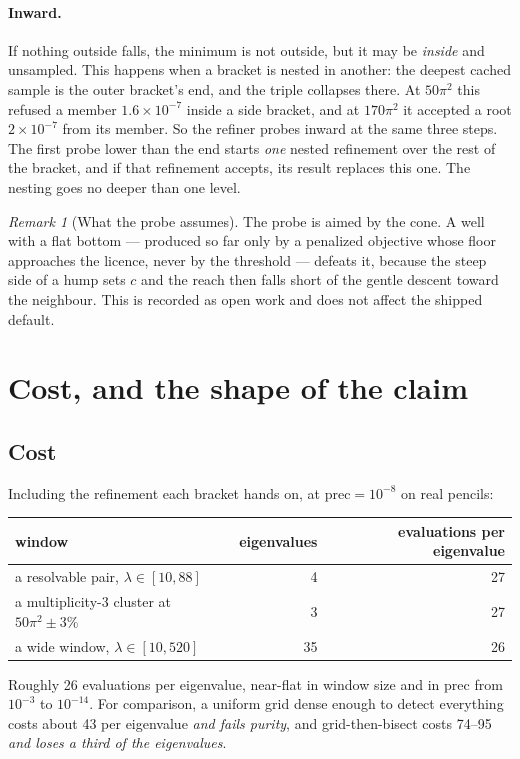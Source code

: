 \documentclass[11pt]{article}
\theoremstyle{definition}
\theoremstyle{remark}
\newtheorem{remark}{Remark}
\newcommand{\lam}{\lambda}
\newcommand{\pr}{\mathrm{prec}}
\begin{document}
\paragraph{Inward.} If nothing outside falls, the minimum is not outside, but it may be
\emph{inside} and unsampled. This happens when a bracket is nested in another: the deepest
cached sample is the outer bracket's end, and the triple collapses there. At $50\pi^2$ this
refused a member $1.6\times10^{-7}$ inside a side bracket, and at $170\pi^2$ it accepted a root
$2\times10^{-7}$ from its member. So the refiner probes inward at the same three steps. The
first probe lower than the end starts \emph{one} nested refinement over the rest of the
bracket, and if that refinement accepts, its result replaces this one. The nesting goes no
deeper than one level.

\begin{remark}[What the probe assumes]
The probe is aimed by the cone. A well with a flat bottom --- produced so far only by a
penalized objective whose floor approaches the licence, never by the threshold --- defeats it,
because the steep side of a hump sets $c$ and the reach then falls short of the gentle descent
toward the neighbour. This is recorded as open work and does not affect the shipped default.
\end{remark}

\section{Cost, and the shape of the claim}
\label{sec:claim}

\subsection{Cost}

Including the refinement each bracket hands on, at $\pr=10^{-8}$ on real pencils:
\begin{center}
\begin{tabular}{lrr}
\toprule
window & eigenvalues & evaluations per eigenvalue\\
\midrule
a resolvable pair, $\lam\in[10,88]$ & 4 & 27\\
a multiplicity-3 cluster at $50\pi^2\pm3\%$ & 3 & 27\\
a wide window, $\lam\in[10,520]$ & 35 & 26\\
\bottomrule
\end{tabular}
\end{center}
Roughly 26 evaluations per eigenvalue, near-flat in window size and in $\pr$ from $10^{-3}$
to $10^{-14}$. For comparison, a uniform grid dense enough to detect everything costs about 43
per eigenvalue \emph{and fails purity}, and grid-then-bisect costs 74--95 \emph{and loses a
third of the eigenvalues}.
\end{document}
